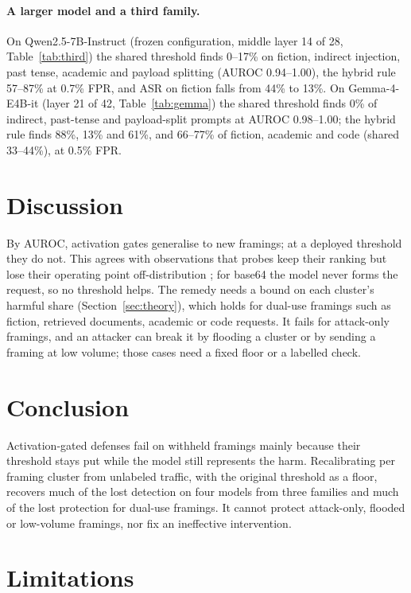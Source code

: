 \documentclass[11pt]{article}
\begin{document}
\paragraph{A larger model and a third family.}
On Qwen2.5-7B-Instruct (frozen configuration, middle layer 14 of 28, Table~\ref{tab:third}) the shared threshold finds 0--17\% on fiction, indirect injection, past tense, academic and payload splitting (AUROC 0.94--1.00), the hybrid rule 57--87\% at 0.7\% FPR, and ASR on fiction falls from 44\% to 13\%. On Gemma-4-E4B-it \citep{gemma2026gemma4} (layer 21 of 42, Table~\ref{tab:gemma}) the shared threshold finds 0\% of indirect, past-tense and payload-split prompts at AUROC 0.98--1.00; the hybrid rule finds 88\%, 13\% and 61\%, and 66--77\% of fiction, academic and code (shared 33--44\%), at 0.5\% FPR.

\section{Discussion}

By AUROC, activation gates generalise to new framings; at a deployed threshold they do not. This agrees with observations that probes keep their ranking but lose their operating point off-distribution \citep{mckenzie2025highstakes,kim2026linearly,azov2026sallie}; for base64 the model never forms the request, so no threshold helps.
The remedy needs a bound on each cluster's harmful share (Section~\ref{sec:theory}), which holds for dual-use framings such as fiction, retrieved documents, academic or code requests. It fails for attack-only framings, and an attacker can break it by flooding a cluster or by sending a framing at low volume; those cases need a fixed floor or a labelled check.

\section{Conclusion}
Activation-gated defenses fail on withheld framings mainly because their threshold stays put while the model still represents the harm. Recalibrating per framing cluster from unlabeled traffic, with the original threshold as a floor, recovers much of the lost detection on four models from three families and much of the lost protection for dual-use framings. It cannot protect attack-only, flooded or low-volume framings, nor fix an ineffective intervention.

\section*{Limitations}
\end{document}
